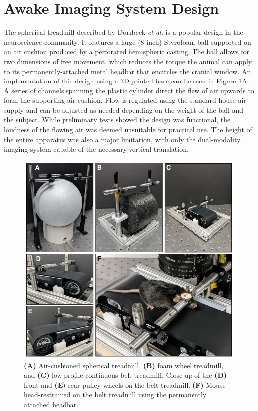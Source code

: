 \section{Awake Imaging System Design}

The spherical treadmill described by Dombeck \textit{et al.} \cite{Dombeck:2007gr} is a popular design in the neuroscience community. It features a large (8-inch) Styrofoam ball supported on an air cushion produced by a perforated hemispheric casting. The ball allows for two dimensions of free movement, which reduces the torque the animal can apply to its permanently-attached metal headbar that encircles the cranial window. An implementation of this design using a 3D-printed base can be seen in Figure \ref{fig:awakesystems}A. A series of channels spanning the plastic cylinder direct the flow of air upwards to form the supporting air cushion. Flow is regulated using the standard house air supply and can be adjusted as needed depending on the weight of the ball and the subject. While preliminary tests showed the design was functional, the loudness of the flowing air was deemed unsuitable for practical use. The height of the entire apparatus was also a major limitation, with only the dual-modality imaging system capable of the necessary vertical translation.

\begin{figure}
    \includegraphics{figures/chapter_5/awakesystems.pdf}
    \caption{
        \label{fig:awakesystems}
        \textbf{(A)} Air-cushioned spherical treadmill, \textbf{(B)} foam wheel treadmill, and \textbf{(C)} low-profile continuous belt treadmill. Close-up of the \textbf{(D)} front and \textbf{(E)} rear pulley wheels on the belt treadmill. \textbf{(F)} Mouse head-restrained on the belt treadmill using the permanently attached headbar.
    }
\end{figure}

